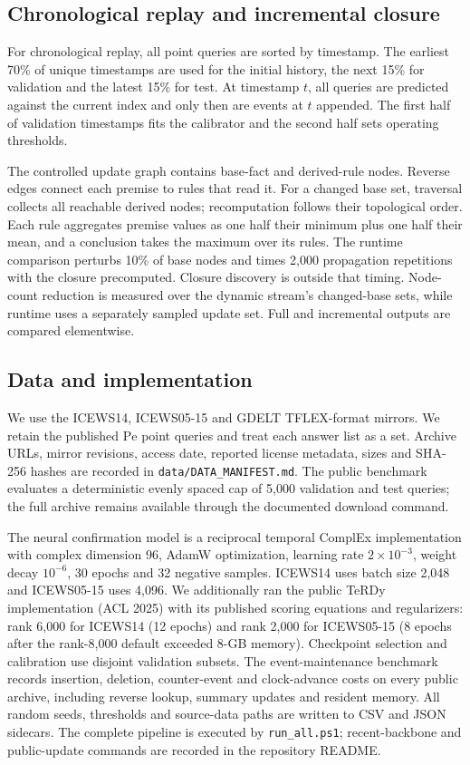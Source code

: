 \documentclass[preprint,12pt]{elsarticle}
\begin{document}
\subsection{Chronological replay and incremental closure}
For chronological replay, all point queries are sorted by timestamp. The earliest 70\% of unique timestamps are used for the initial history, the next 15\% for validation and the latest 15\% for test. At timestamp $t$, all queries are predicted against the current index and only then are events at $t$ appended. The first half of validation timestamps fits the calibrator and the second half sets operating thresholds.

The controlled update graph contains base-fact and derived-rule nodes. Reverse edges connect each premise to rules that read it. For a changed base set, traversal collects all reachable derived nodes; recomputation follows their topological order. Each rule aggregates premise values as one half their minimum plus one half their mean, and a conclusion takes the maximum over its rules. The runtime comparison perturbs 10\% of base nodes and times 2,000 propagation repetitions with the closure precomputed. Closure discovery is outside that timing. Node-count reduction is measured over the dynamic stream's changed-base sets, while runtime uses a separately sampled update set. Full and incremental outputs are compared elementwise.

\subsection{Data and implementation}
We use the ICEWS14, ICEWS05-15 and GDELT TFLEX-format mirrors. We retain the published $\mathrm{Pe}$ point queries and treat each answer list as a set. Archive URLs, mirror revisions, access date, reported license metadata, sizes and SHA-256 hashes are recorded in \texttt{data/DATA\_MANIFEST.md}. The public benchmark evaluates a deterministic evenly spaced cap of 5,000 validation and test queries; the full archive remains available through the documented download command.

The neural confirmation model is a reciprocal temporal ComplEx implementation with complex dimension 96, AdamW optimization, learning rate $2\times10^{-3}$, weight decay $10^{-6}$, 30 epochs and 32 negative samples. ICEWS14 uses batch size 2,048 and ICEWS05-15 uses 4,096. We additionally ran the public TeRDy implementation (ACL 2025) with its published scoring equations and regularizers: rank 6,000 for ICEWS14 (12 epochs) and rank 2,000 for ICEWS05-15 (8 epochs after the rank-8,000 default exceeded 8-GB memory). Checkpoint selection and calibration use disjoint validation subsets. The event-maintenance benchmark records insertion, deletion, counter-event and clock-advance costs on every public archive, including reverse lookup, summary updates and resident memory. All random seeds, thresholds and source-data paths are written to CSV and JSON sidecars. The complete pipeline is executed by \texttt{run\_all.ps1}; recent-backbone and public-update commands are recorded in the repository README.
\end{document}
